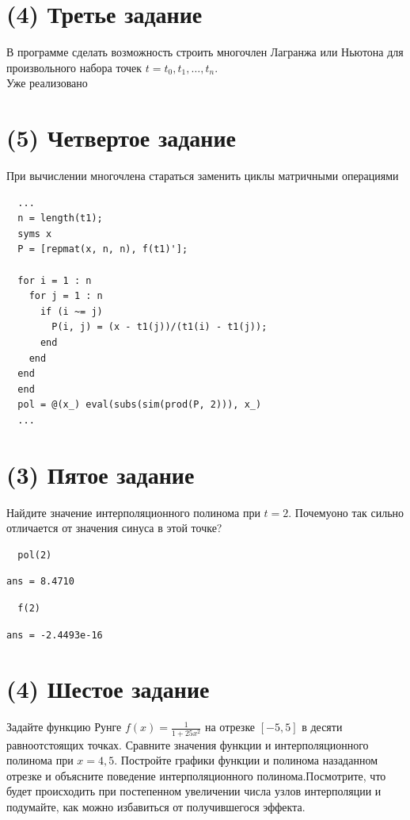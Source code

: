 \section{(4) Третье задание}
В программе сделать возможность строить многочлен Лагранжа или Ньютона для произвольного набора точек $t = t_{0}, t_{1}, \ldots, t_{n}$.\\[2mm]
Уже реализовано


\section{(5) Четвертое задание}
При вычислении многочлена стараться заменить циклы матричными операциями

\begin{lstlisting}
  ...
  n = length(t1);
  syms x
  P = [repmat(x, n, n), f(t1)'];

  for i = 1 : n
    for j = 1 : n
      if (i ~= j)
        P(i, j) = (x - t1(j))/(t1(i) - t1(j));
      end
    end
  end
  end
  pol = @(x_) eval(subs(sim(prod(P, 2))), x_)
  ...
\end{lstlisting}

\section{(3) Пятое задание}
Найдите значение интерполяционного полинома при $t = 2$. Почемуоно так сильно отличается от значения синуса в этой точке?\\[2mm]
\begin{lstlisting}
  pol(2)
\end{lstlisting}

\begin{lstlisting}[backgroundcolor=\color{cyan}]
  ans = 8.4710
\end{lstlisting}

\begin{lstlisting}
  f(2)
\end{lstlisting}

\begin{lstlisting}[backgroundcolor=\color{cyan}]
  ans = -2.4493e-16
\end{lstlisting}

\section{(4) Шестое задание}
Задайте функцию Рунге $f(x) = \frac{1}{1+25x^{2}}$ на отрезке $\left[-5, 5\right]$ в десяти равноотстоящих точках. Сравните значения функции и интерполяционного полинома при $x=4,5$. Постройте графики функции и полинома назаданном отрезке и объясните поведение интерполяционного полинома.Посмотрите, что будет происходить при постепенном увеличении числа узлов интерполяции и подумайте, как можно избавиться от получившегося эффекта.\\[2mm]

